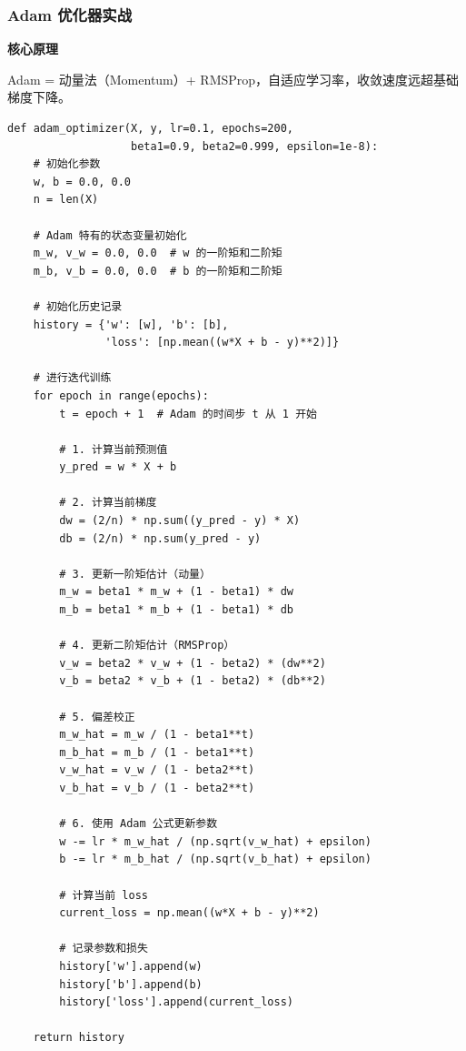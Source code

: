\documentclass[10pt]{article}
\numberwithin{equation}{section}
\theoremstyle{plain}
\theoremstyle{definition}
\theoremstyle{remark}
\begin{document}
\subsubsection{Adam 优化器实战}

\textbf{核心原理}

Adam = 动量法（Momentum）+ RMSProp，自适应学习率，收敛速度远超基础梯度下降。

\begin{CodeBox}
	\begin{lstlisting}[style=PythonStyle]
def adam_optimizer(X, y, lr=0.1, epochs=200, 
                   beta1=0.9, beta2=0.999, epsilon=1e-8):
    # 初始化参数
    w, b = 0.0, 0.0
    n = len(X)
    
    # Adam 特有的状态变量初始化
    m_w, v_w = 0.0, 0.0  # w 的一阶矩和二阶矩
    m_b, v_b = 0.0, 0.0  # b 的一阶矩和二阶矩
    
    # 初始化历史记录
    history = {'w': [w], 'b': [b], 
               'loss': [np.mean((w*X + b - y)**2)]}
    
    # 进行迭代训练
    for epoch in range(epochs):
        t = epoch + 1  # Adam 的时间步 t 从 1 开始
        
        # 1. 计算当前预测值
        y_pred = w * X + b
        
        # 2. 计算当前梯度
        dw = (2/n) * np.sum((y_pred - y) * X)
        db = (2/n) * np.sum(y_pred - y)
        
        # 3. 更新一阶矩估计（动量）
        m_w = beta1 * m_w + (1 - beta1) * dw
        m_b = beta1 * m_b + (1 - beta1) * db
        
        # 4. 更新二阶矩估计（RMSProp）
        v_w = beta2 * v_w + (1 - beta2) * (dw**2)
        v_b = beta2 * v_b + (1 - beta2) * (db**2)
        
        # 5. 偏差校正
        m_w_hat = m_w / (1 - beta1**t)
        m_b_hat = m_b / (1 - beta1**t)
        v_w_hat = v_w / (1 - beta2**t)
        v_b_hat = v_b / (1 - beta2**t)
        
        # 6. 使用 Adam 公式更新参数
        w -= lr * m_w_hat / (np.sqrt(v_w_hat) + epsilon)
        b -= lr * m_b_hat / (np.sqrt(v_b_hat) + epsilon)
        
        # 计算当前 loss
        current_loss = np.mean((w*X + b - y)**2)
        
        # 记录参数和损失
        history['w'].append(w)
        history['b'].append(b)
        history['loss'].append(current_loss)
    
    return history
\end{lstlisting}
\end{CodeBox}
\end{document}
